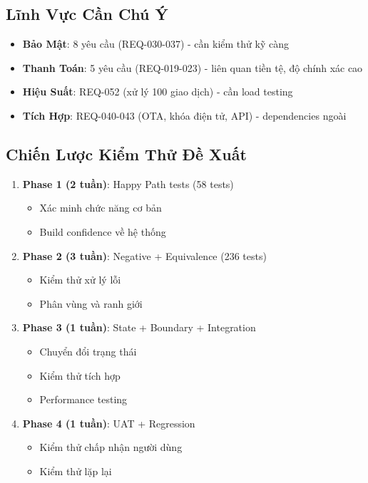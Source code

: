 \documentclass[12pt, a4paper]{article}
\begin{document}
\subsection{Lĩnh Vực Cần Chú Ý}

\begin{itemize}
    \item \textbf{Bảo Mật}: 8 yêu cầu (REQ-030-037) - cần kiểm thử kỹ càng
    \item \textbf{Thanh Toán}: 5 yêu cầu (REQ-019-023) - liên quan tiền tệ, độ chính xác cao
    \item \textbf{Hiệu Suất}: REQ-052 (xử lý 100 giao dịch) - cần load testing
    \item \textbf{Tích Hợp}: REQ-040-043 (OTA, khóa điện tử, API) - dependencies ngoài
\end{itemize}

\subsection{Chiến Lược Kiểm Thử Đề Xuất}

\begin{enumerate}
    \item \textbf{Phase 1 (2 tuần)}: Happy Path tests (58 tests)
    \begin{itemize}
        \item Xác minh chức năng cơ bản
        \item Build confidence về hệ thống
    \end{itemize}
    
    \item \textbf{Phase 2 (3 tuần)}: Negative + Equivalence (236 tests)
    \begin{itemize}
        \item Kiểm thử xử lý lỗi
        \item Phân vùng và ranh giới
    \end{itemize}
    
    \item \textbf{Phase 3 (1 tuần)}: State + Boundary + Integration
    \begin{itemize}
        \item Chuyển đổi trạng thái
        \item Kiểm thử tích hợp
        \item Performance testing
    \end{itemize}
    
    \item \textbf{Phase 4 (1 tuần)}: UAT + Regression
    \begin{itemize}
        \item Kiểm thử chấp nhận người dùng
        \item Kiểm thử lặp lại
    \end{itemize}
\end{enumerate}
\end{document}
